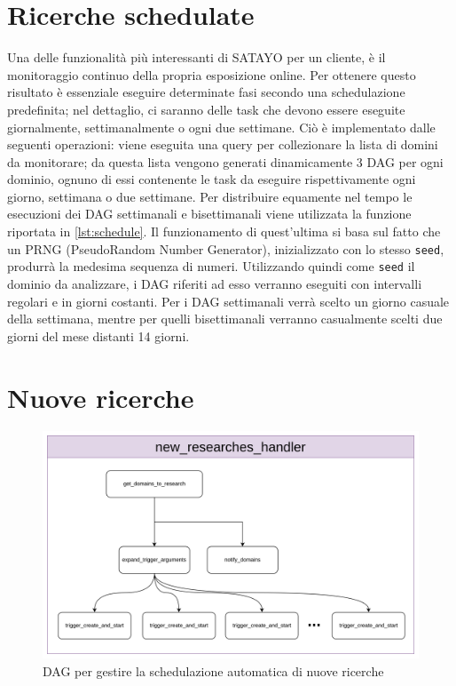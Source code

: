 

\section{Ricerche schedulate}
\label{sec:schedulate}



Una delle funzionalità più interessanti di SATAYO per un cliente, è il monitoraggio
continuo della propria esposizione online. Per ottenere questo risultato è
essenziale eseguire determinate fasi secondo una schedulazione predefinita; nel dettaglio,
ci saranno delle task che devono essere eseguite giornalmente, settimanalmente o
ogni due settimane. Ciò è implementato dalle seguenti operazioni: viene eseguita
una query per collezionare la lista di domini da monitorare; da questa lista
vengono generati dinamicamente 3 DAG per ogni dominio, ognuno di essi contenente
le task da eseguire rispettivamente ogni giorno, settimana o due settimane. Per distribuire
equamente nel tempo le esecuzioni dei DAG settimanali e bisettimanali viene utilizzata
la funzione riportata in \ref{lst:schedule}. Il funzionamento di quest'ultima si
basa sul fatto che un PRNG (PseudoRandom Number Generator)\cite{py-random},
inizializzato con lo stesso \texttt{seed}, produrrà la medesima sequenza di
numeri. Utilizzando quindi come \texttt{seed} il dominio da analizzare, i DAG riferiti
ad esso verranno eseguiti con intervalli regolari e in giorni costanti. Per i
DAG settimanali verrà scelto un giorno casuale della settimana, mentre per quelli
bisettimanali verranno casualmente scelti due giorni del mese distanti 14 giorni.

\section{Nuove ricerche}
\label{sec:nuove}

\begin{figure}[htbp]
  \centering
  \includegraphics[width=.8\linewidth]{images/new_research_handler.png}
  \caption{DAG per gestire la schedulazione automatica di nuove ricerche}
  \label{fig:new-hanlder}
\end{figure}

